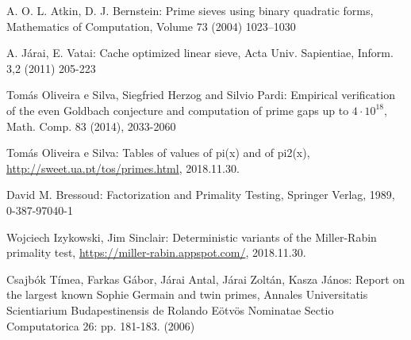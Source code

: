\documentclass[12pt]{report}
\begin{document}






\begin{thebibliography}{9}

A. O. L. Atkin, D. J. Bernstein: Prime sieves using binary quadratic forms, Mathematics of Computation, Volume 73 (2004) 1023–1030

A. Járai, E. Vatai: Cache optimized linear sieve, Acta Univ. Sapientiae, Inform. 3,2 (2011) 205-223

Tomás Oliveira e Silva, Siegfried Herzog and Silvio Pardi: Empirical verification of the even Goldbach conjecture and computation of prime gaps up to $4\cdot10^{18}$, Math. Comp. 83 (2014), 2033-2060

Tomás Oliveira e Silva: Tables of values of pi(x) and of pi2(x), \url{http://sweet.ua.pt/tos/primes.html}, 2018.11.30.

David M. Bressoud: Factorization and Primality Testing, Springer Verlag, 1989, 0-387-97040-1

Wojciech Izykowski, Jim Sinclair: Deterministic variants of the Miller-Rabin primality test, \url{https://miller-rabin.appspot.com/}, 2018.11.30.

Csajbók Tímea, Farkas Gábor, Járai Antal, Járai Zoltán, Kasza János: Report on the largest known Sophie Germain and twin primes, Annales Universitatis Scientiarium Budapestinensis de Rolando Eötvös Nominatae Sectio Computatorica 26: pp. 181-183. (2006)


\end{thebibliography}
\end{document}
